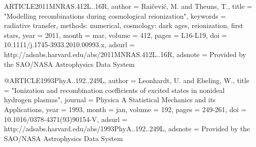 ARTICLE{2011MNRAS.412L..16R,
   author = {{Rai{\v c}evi{\'c}}, M. and {Theuns}, T.},
    title = "{Modelling recombinations during cosmological reionization}",
 keywords = {radiative transfer, methods: numerical, cosmology: dark ages, reionization, first stars},
     year = 2011,
    month = mar,
   volume = 412,
    pages = {L16-L19},
      doi = {10.1111/j.1745-3933.2010.00993.x},
   adsurl = {http://adsabs.harvard.edu/abs/2011MNRAS.412L..16R},
  adsnote = {Provided by the SAO/NASA Astrophysics Data System}
}

@ARTICLE{1993PhyA..192..249L,
   author = {{Leonhardt}, U. and {Ebeling}, W.},
    title = "{Ionization and recombination coefficients of excited states in nonideal hydrogen plasmas}",
  journal = {Physica A Statistical Mechanics and its Applications},
     year = 1993,
    month = jan,
   volume = 192,
    pages = {249-261},
      doi = {10.1016/0378-4371(93)90154-V},
   adsurl = {http://adsabs.harvard.edu/abs/1993PhyA..192..249L},
  adsnote = {Provided by the SAO/NASA Astrophysics Data System}
}
